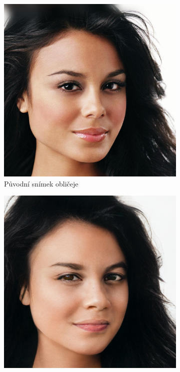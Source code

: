 \begin{figure}[H]
    \centering
    \begin{subfigure}{0.45\textwidth}
         \centering
         \includegraphics[width=1\textwidth]{obrazky-figures/stylegan3-real-image.jpg}
         \caption{Původní snímek obličeje}
         \label{fig:stylegan3-real-image}
     \end{subfigure}
     \hfill
     \begin{subfigure}{0.45\textwidth}
         \centering
         \includegraphics[width=1\textwidth]{obrazky-figures/stylegan3-gen-image.png}

\end{subfigure}
\end{figure}
